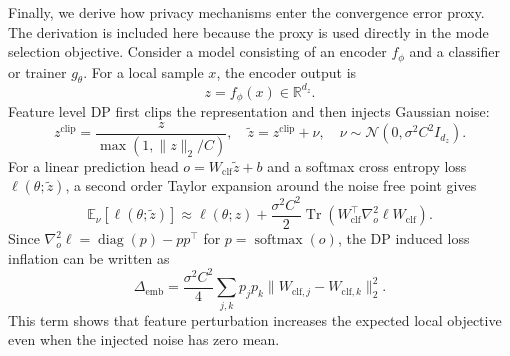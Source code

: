 ﻿\documentclass[preprint,12pt]{elsarticle}
\theoremstyle{plain}
\theoremstyle{definition}
\theoremstyle{remark}
\begin{document}
Finally, we derive how privacy mechanisms enter the convergence error proxy.
The derivation is included here because the proxy is used directly in the mode selection objective.
Consider a model consisting of an encoder \(f_{\phi}\) and a classifier or trainer \(g_{\theta}\).
For a local sample \(x\), the encoder output is
\begin{equation}
    z=f_{\phi}(x)\in\mathbb{R}^{d_z}.
\end{equation}
Feature level DP first clips the representation and then injects Gaussian noise:
\begin{equation}
    z^{\mathrm{clip}}
    =
    \frac{z}{\max(1,\|z\|_2/C)},
    \quad
    \tilde{z}=z^{\mathrm{clip}}+\nu,
    \quad
    \nu\sim\mathcal{N}(0,\sigma^2C^2I_{d_z}).
\label{eq:feature_dp_noise}
\end{equation}
For a linear prediction head \(o=W_{\mathrm{clf}}\tilde{z}+b\) and a softmax cross entropy loss \(\ell(\theta;\tilde{z})\), a second order Taylor expansion around the noise free point gives
\begin{equation}
\mathbb{E}_{\nu}[\ell(\theta;\tilde{z})]
\approx
\ell(\theta;z)
+\frac{\sigma^2C^2}{2}
\operatorname{Tr}\left(W_{\mathrm{clf}}^\top\nabla_o^2\ell W_{\mathrm{clf}}\right).
\label{eq:dp_loss_taylor}
\end{equation}
Since \(\nabla_o^2\ell=\operatorname{diag}(p)-pp^\top\) for \(p=\operatorname{softmax}(o)\), the DP induced loss inflation can be written as
\begin{equation}
    \Delta_{\mathrm{emb}}
    =
    \frac{\sigma^2C^2}{4}
    \sum_{j,k}p_jp_k
    \|W_{\mathrm{clf},j}-W_{\mathrm{clf},k}\|_2^2 .
\label{eq:delta_emb}
\end{equation}
This term shows that feature perturbation increases the expected local objective even when the injected noise has zero mean.
\end{document}

